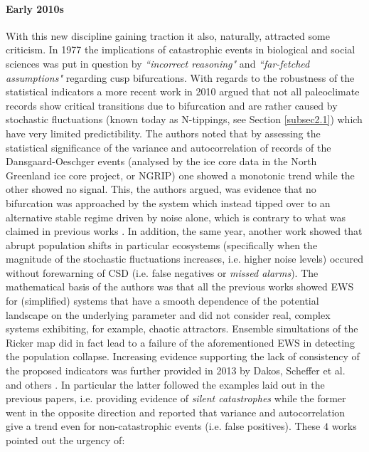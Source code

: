 \documentclass[../main.tex]{subfiles}
\begin{document}
\paragraph{Early 2010s}
With this new discipline gaining traction it also, naturally, attracted some criticism. 
In 1977 the implications of catastrophic events in biological and social sciences was put in question \cite{Zahler77} by \textit{``incorrect reasoning"} and \textit{``far-fetched assumptions"} regarding cusp bifurcations.
With regards to the robustness of the statistical indicators a more recent work in 2010 \cite{Ditlevsen10} argued that not all paleoclimate records show critical transitions due to bifurcation and are rather caused by stochastic fluctuations (known today as N-tippings, see Section \ref{subsec2.1}) which have very limited predictibility. 
The authors noted that by assessing the statistical significance of the variance and autocorrelation of records of the Dansgaard-Oeschger events (analysed by the ice core data in the North Greenland ice core project, or NGRIP) one showed a monotonic trend while the other showed no signal. 
This, the authors argued, was evidence that no bifurcation was approached by the system which instead tipped over to an alternative stable regime driven by noise alone, which is contrary to what was claimed in previous works \cite{Dakos08,Scheffer09}.
In addition, the same year, another work showed that abrupt population shifts in particular ecosystems (specifically when the magnitude of the stochastic fluctuations increases, i.e. higher noise levels) occured without forewarning \cite{Hastings10} of CSD (i.e. false negatives or \textit{missed alarms}).
The mathematical basis of the authors was that all the previous works showed EWS for (simplified) systems that have a smooth dependence of the potential landscape on the underlying parameter and did not consider real, complex systems exhibiting, for example, chaotic attractors. 
Ensemble simultations of the Ricker map did in fact lead to a failure of the aforementioned EWS in detecting the population collapse.
Increasing evidence supporting the lack of consistency of the proposed indicators was further provided in 2013 by Dakos, Scheffer et al. \cite{Kefi13} and others \cite{Boerlijst13}. 
In particular the latter followed the examples laid out in the previous papers, i.e. providing evidence of \textit{silent catastrophes} while the former went in the opposite direction and reported that variance and autocorrelation give a trend even for non-catastrophic events (i.e. false positives).
These $4$ works pointed out the urgency of: 
\end{document}
